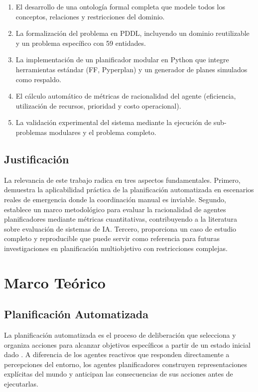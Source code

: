 \documentclass[conference]{IEEEtran}
\begin{document}
    \begin{enumerate}
        \item El desarrollo de una ontología formal completa que modele todos los conceptos, relaciones y restricciones del dominio.
        \item La formalización del problema en PDDL, incluyendo un dominio reutilizable y un problema específico con 59 entidades.
        \item La implementación de un planificador modular en Python que integre herramientas estándar (FF, Pyperplan) y un generador de planes simulados como respaldo.
        \item El cálculo automático de métricas de racionalidad del agente (eficiencia, utilización de recursos, prioridad y costo operacional).
        \item La validación experimental del sistema mediante la ejecución de sub-problemas modulares y el problema completo.
    \end{enumerate}

    \subsection{Justificación}

    La relevancia de este trabajo radica en tres aspectos fundamentales. Primero, demuestra la aplicabilidad práctica de la planificación automatizada en escenarios reales de emergencia donde la coordinación manual es inviable. Segundo, establece un marco metodológico para evaluar la racionalidad de agentes planificadores mediante métricas cuantitativas, contribuyendo a la literatura sobre evaluación de sistemas de IA. Tercero, proporciona un caso de estudio completo y reproducible que puede servir como referencia para futuras investigaciones en planificación multiobjetivo con restricciones complejas.

    \section{Marco Teórico}

    \subsection{Planificación Automatizada}

    La planificación automatizada es el proceso de deliberación que selecciona y organiza acciones para alcanzar objetivos específicos a partir de un estado inicial dado \cite{russell2020aima}. A diferencia de los agentes reactivos que responden directamente a percepciones del entorno, los agentes planificadores construyen representaciones explícitas del mundo y anticipan las consecuencias de sus acciones antes de ejecutarlas.
\end{document}
